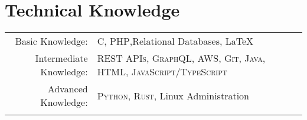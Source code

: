 \documentclass[letterpaper,10pt]{article}
\begin{document}
\pagestyle{plain}
\thispagestyle{fancy}


\section{Technical Knowledge}
\begin{tabular}{rl}
	Basic Knowledge:        & \textsc{C, PHP},Relational Databases, \LaTeX                                      \\
	Intermediate Knowledge: & \textsc{REST APIs, GraphQL}, AWS, \textsc{Git, Java, HTML, JavaScript/TypeScript} \\
	Advanced Knowledge:     & \textsc{Python}, \textsc{Rust}, Linux Administration                              \\\\
\end{tabular}

\end{document}
